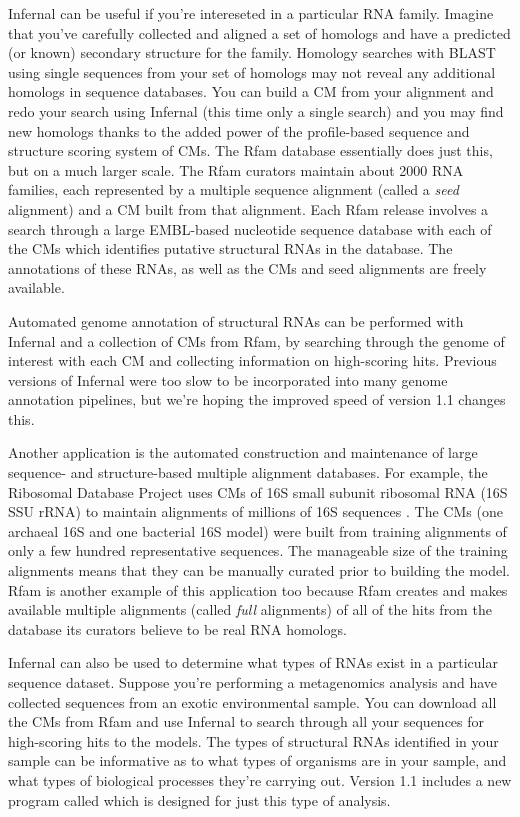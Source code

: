 Infernal can be useful if you're intereseted in a particular RNA
family. Imagine that you've carefully collected and aligned a set of
homologs and have a predicted (or known) secondary structure for the
family. Homology searches with BLAST using single sequences from your
set of homologs may not reveal any additional homologs in sequence
databases. You can build a CM from your alignment and redo your search
using Infernal (this time only a single search) and you may find new
homologs thanks to the added power of the profile-based sequence and
structure scoring system of CMs. The Rfam database \citep{Gardner11}
essentially does just this, but on a much larger scale. The Rfam
curators maintain about 2000 RNA families, each represented by a
multiple sequence alignment (called a \emph{seed} alignment) and a CM
built from that alignment. Each Rfam release involves a search through
a large EMBL-based nucleotide sequence database with each of the CMs
which identifies putative structural RNAs in the database. The
annotations of these RNAs, as well as the CMs and seed alignments are
freely available.

Automated genome annotation of structural RNAs can be performed with
Infernal and a collection of CMs from Rfam, by searching
through the genome of interest with each CM and collecting information
on high-scoring hits. Previous versions of Infernal were too slow to
be incorporated into many genome annotation pipelines, but we're
hoping the improved speed of version 1.1 changes this.

Another application is the automated construction and maintenance of
large sequence- and structure-based multiple alignment databases.  For
example, the Ribosomal Database Project uses CMs of 16S small subunit
ribosomal RNA (16S SSU rRNA) to maintain alignments of millions of 16S
sequences \citep{Cole09}. The CMs (one archaeal 16S and one bacterial
16S model) were built from training alignments of only a few hundred
representative sequences. The manageable size of the training
alignments means that they can be manually curated prior to building
the model. Rfam is another example of this application too because
Rfam creates and makes available multiple alignments (called \emph{full}
alignments) of all of the hits from the database its curators believe
to be real RNA homologs.

Infernal can also be used to determine what types of RNAs exist in a
particular sequence dataset. Suppose you're performing a metagenomics
analysis and have collected sequences from an exotic environmental
sample. You can download all the CMs from Rfam and use Infernal to
search through all your sequences for high-scoring hits to the
models. The types of structural RNAs identified in your sample can be
informative as to what types of organisms are in your sample, and what
types of biological processes they're carrying out. Version 1.1
includes a new program called  which is designed for just
this type of analysis.

